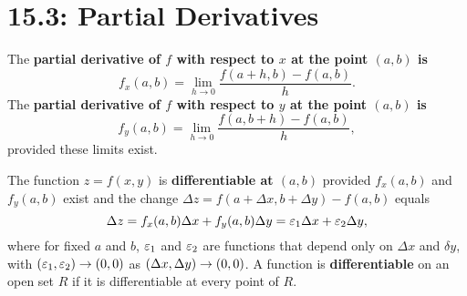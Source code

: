 \documentclass[mathNotesPreamble]{subfiles}
\begin{document}
\section{15.3: Partial Derivatives}

  \begin{defn*}
    The \textbf{partial derivative of $f$ with respect to $x$ at the point $(a,b)$ is}
      \[f_x(a,b)=\lim_{h\to 0} \frac{f(a+h,b)-f(a,b)}{h}.\]
    The \textbf{partial derivative of $f$ with respect to $y$ at the point $(a,b)$ is}
      \[f_y(a,b)=\lim_{h\to 0} \frac{f(a,b+h)-f(a,b)}{h},\]
    provided these limits exist.
  \end{defn*}

  \noindent

  \begin{defn*}[Differentiability]
    The function $z=f(x,y)$ is \textbf{differentiable at $(a,b)$} provided $f_x(a,b)$ and $f_y(a,b)$ exist and the change $\Delta z=f(a+\Delta x, b+\Delta y)-f(a,b)$ equals
      \[\Delta z=f_x(a,b)\Delta x+ f_y(a,b)\Delta y=\varepsilon_1\Delta x+\varepsilon_2\Delta y,\]
    where for fixed $a$ and $b$, $\varepsilon_1$ and $\varepsilon_2$ are functions that depend only on $\Delta x$ and $\delta y$, with ${\left(\varepsilon_1,\varepsilon_2\right)}\to (0,0)$ as ${\left(\Delta x,\Delta y\right)}\to(0,0)$. A function is \textbf{differentiable} on an open set $R$ if it is differentiable at every point of $R$.
  \end{defn*}

  \noindent

  \noindent

  \pagebreak
  
\end{document}
